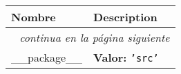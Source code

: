     \vspace{-1cm}
\hspace{\varindent}\begin{longtable}{|p{\varnamewidth}|p{\vardescrwidth}|l}
\cline{1-2}
\cline{1-2} \centering \textbf{Nombre} & \centering \textbf{Description}& \\
\cline{1-2}
\endhead\cline{1-2}\multicolumn{3}{r}{\small\textit{continua en la página siguiente}}\\\endfoot\cline{1-2}
\endlastfoot\raggedright \_\-\_\-p\-a\-c\-k\-a\-g\-e\-\_\-\_\- & \raggedright \textbf{Valor:} 
{\tt \texttt{'}\texttt{src}\texttt{'}}&\\
\cline{1-2}
\end{longtable}


